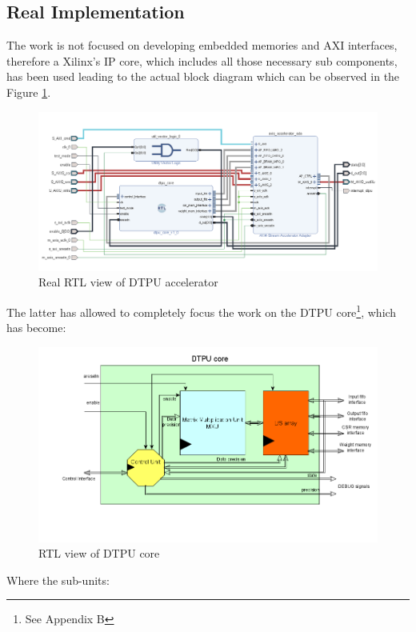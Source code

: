 \subsection{Real Implementation}
The work is not focused on developing embedded memories and AXI interfaces, therefore a Xilinx's IP core, which includes all those necessary sub components, has been used \cite{paper:43} leading to the actual block diagram which can be observed in the Figure \ref{fig:rtlaccel}.
\begin{figure}[H]
\centering
\captionsetup{justification=centering}
\includegraphics[scale=0.8,angle=0]{./figure/accelerator_schematic.png}
\caption{Real RTL view of DTPU accelerator}
\label{fig:rtlaccel}
\end{figure} 
The latter has allowed to completely focus the work on the DTPU core\footnote{See Appendix B}, which has become:
\begin{figure}[H]
\centering
\captionsetup{justification=centering}
\includegraphics[scale=0.45,angle=0]{./figure/dtpu_core.png}
\caption{RTL view of DTPU core}
\label{fig:dtpucore}
\end{figure} 
Where the sub-units:
